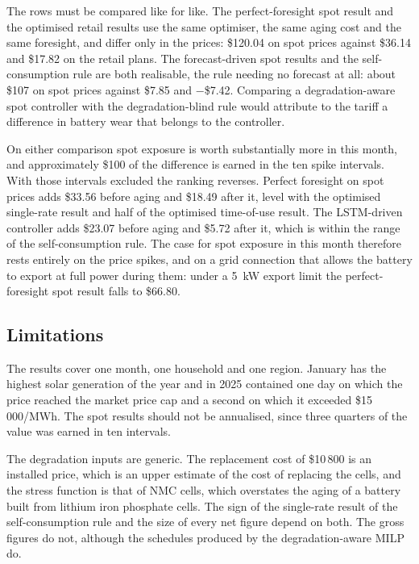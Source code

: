 The rows must be compared like for like. The perfect-foresight spot result and the
optimised retail results use the same optimiser, the same aging cost and the same
foresight, and differ only in the prices: \$120.04 on spot prices against \$36.14 and
\$17.82 on the retail plans. The forecast-driven spot results and the self-consumption
rule are both realisable, the rule needing no forecast at all: about \$107 on spot
prices against \$7.85 and $-$\$7.42. Comparing a degradation-aware spot controller with
the degradation-blind rule would attribute to the tariff a difference in battery wear
that belongs to the controller.

On either comparison spot exposure is worth substantially more in this month, and
approximately \$100 of the difference is earned in the ten spike intervals. With those
intervals excluded the ranking reverses. Perfect foresight on spot prices adds \$33.56
before aging and \$18.49 after it, level with the optimised single-rate result and half
of the optimised time-of-use result. The LSTM-driven controller adds \$23.07 before
aging and \$5.72 after it, which is within the range of the self-consumption rule. The
case for spot exposure in this month therefore rests entirely on the price spikes, and
on a grid connection that allows the battery to export at full power during them: under
a 5~kW export limit the perfect-foresight spot result falls to \$66.80.

\subsection{Limitations}
\label{sec:results:limitations}

The results cover one month, one household and one region. January has the highest solar
generation of the year and in 2025 contained one day on which the price reached the
market price cap and a second on which it exceeded \$15\,000/MWh. The spot results should not be annualised, since three quarters of the
value was earned in ten intervals.

The degradation inputs are generic. The replacement cost of \$10\,800 is an installed
price, which is an upper estimate of the cost of replacing the cells, and the stress
function is that of NMC cells, which overstates the aging of a battery built from
lithium iron phosphate cells. The sign of
the single-rate result of the self-consumption rule and the size of every net figure
depend on both. The
gross figures do not, although the schedules produced by the degradation-aware MILP do.

